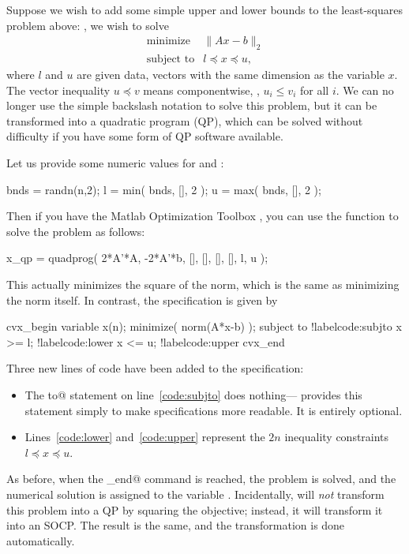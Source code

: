 \documentclass[12pt]{article}
\begin{document}
Suppose we wish to add some simple upper and
lower bounds to the least-squares problem above: \ie, we wish to solve 
\begin{equation}
\begin{array}{ll}
\mbox{minimize} & \|Ax-b\|_2\\
\mbox{subject to} & l \preceq x \preceq u,
\end{array}
\label{eq:bcls}
\end{equation}
where $l$ and $u$ are given data, vectors with the same dimension
as the variable $x$.
The vector inequality $u \preceq v$ means componentwise, \ie,
$u_i \leq v_i$ for all $i$. We can no longer use the simple
backslash notation to solve this problem, but it can be transformed
into a quadratic program (QP), which can be solved without difficulty
if you have some form
of QP software available. 

Let us provide some numeric values for \verb@l@ and \verb@u@:
\begin{code2}[firstnumber=47]
	bnds = randn(n,2);
	l = min( bnds, [], 2 );
	u = max( bnds, [], 2 );
\end{code2}
Then if you have the Matlab
Optimization Toolbox \cite{MATOPT}, you can use the \verb@quadprog@ function
to solve the problem as follows:
\begin{code2}[firstnumber=53]
	x_qp = quadprog( 2*A'*A, -2*A'*b, [], [], [], [], l, u );
\end{code2}
This actually minimizes the square of the norm, which is the same as
minimizing the norm itself. In contrast, the \cvx specification is given by
\begin{code2}[firstnumber=59]
	cvx_begin
	    variable x(n);
	    minimize( norm(A*x-b) );
	    subject to			!label{code:subjto}
	        x >= l;			!label{code:lower}
	        x <= u;			!label{code:upper}
	cvx_end
\end{code2}
Three new lines of \cvx code have been added to the \cvx specification:
\begin{itemize}
\item The \verb@subject to@ statement on line~\ref{code:subjto} does nothing---\cvx
provides this statement simply to make specifications more readable. 
It is entirely optional.
\item Lines~\ref{code:lower} and~\ref{code:upper}
represent the $2n$ inequality constraints $l \preceq x \preceq u$.
\end{itemize}
As before, when the \verb@cvx_end@ command is reached, the problem
is solved, and the numerical solution is assigned to the variable
\verb@x@. Incidentally, \cvx will 
\emph{not} transform this problem into a QP by squaring the objective;
instead, it will transform it
into an SOCP. The result is the same, and the transformation
is done automatically.
\end{document}
